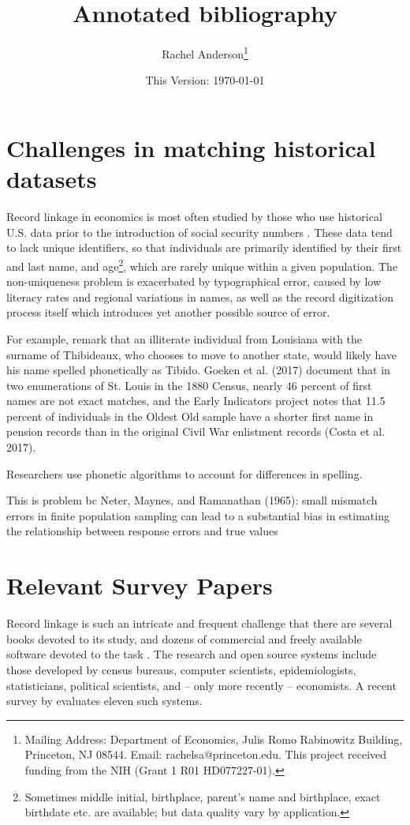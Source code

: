 \documentclass[12pt]{article}
\title{\singlespacing Annotated bibliography}
\author{\singlespacing \vspace{-50pt} Rachel Anderson\thanks{Mailing Address: Department of Economics, Julis Romo Rabinowitz Building, Princeton, NJ 08544. Email: rachelsa@princeton.edu. This project received funding from the NIH (Grant 1 R01 HD077227-01). }}
\date{\vspace{-40pt} This Version: \today}
\begin{document}
\doublespacing
\maketitle

\section{Challenges in matching historical datasets}
Record linkage in economics is most often studied by those who use historical U.S. data prior to the introduction of social security numbers \citep{abe2019,aizer2016,ferrie96}.  These data tend to lack unique identifiers, so that individuals are primarily identified by their first and last name, and age\footnote{Sometimes middle initial, birthplace, parent's name and birthplace, exact birthdate etc. are available; but data quality vary by application.}, which are rarely unique within a given population.   The non-uniqueness problem is exacerbated by typographical error, caused by low literacy rates and regional variations in names, as well as the record digitization process itself which introduces yet another possible source of error.    

For example, \cite{nq2015} remark that an illiterate individual from Louisiana with the surname of Thibideaux, who chooses to move to another state, would likely have his name spelled phonetically as Tibido.  Goeken et al. (2017) document that in two enumerations of St. Louis in the 1880 Census, nearly 46 percent of first names are not exact matches, and the Early Indicators project notes that 11.5 percent of individuals in the Oldest Old sample have a shorter first name in pension records than in the original Civil War enlistment records (Costa et al. 2017). 



Researchers use phonetic algorithms to account for differences in spelling.  



This is problem bc  Neter, Maynes, and Ramanathan (1965): small mismatch errors in finite population sampling can lead to a substantial bias in estimating the relationship between response errors and true values

\section{Relevant Survey Papers}

Record linkage is such an intricate and frequent challenge that there are several books devoted to its study, and dozens of commercial and freely available software devoted to the task \citep{christen2012, herzog07}.  The research and open source systems include those developed by census bureaus, computer scientists, epidemiologists, statisticians, political scientists, and -- only more recently -- economists.  A recent survey by \cite{kopcke2010} evaluates eleven such systems.  
\end{document}
